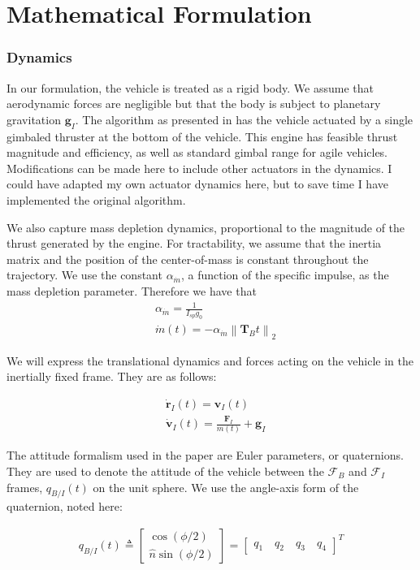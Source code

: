 \chapter{Mathematical Formulation}
\label{mathchapter}



\subsection{Dynamics}
In our formulation, the vehicle is treated as a rigid body. We assume that aerodynamic forces are negligible but that the body is subject to planetary gravitation $\mathbf{g}_I$. The algorithm as presented in \cite{6dofsucc} has the vehicle actuated by a single gimbaled thruster at the bottom of the vehicle. This engine has feasible thrust magnitude and efficiency, as well as standard gimbal range for agile vehicles. Modifications can be made here to include other actuators in the dynamics. I could have adapted my own actuator dynamics here, but to save time I have implemented the original algorithm.

We also capture mass depletion dynamics, proportional to the magnitude of the thrust generated by the engine. For tractability, we assume that the inertia matrix and the position of the center-of-mass is constant throughout the trajectory. We use the constant $\alpha_{\dot{m}}$, a function of the specific impulse, as the mass depletion parameter. Therefore we have that
\begin{align}
& \alpha_{\dot{m}} = \frac{1}{I_{sp} g_0} \\
& \dot{m}(t) = -\alpha_{\dot{m}} \left\lVert \mathbf{T}_B{t} \right\rVert _2
\end{align}

We will express the translational dynamics and forces acting on the vehicle in the inertially fixed frame. They are as follows:

\begin{align}
& \dot{\mathbf{r}}_I(t) = \mathbf{v}_I(t) \\
& \dot{\mathbf{v}}_I(t) = \frac{\mathbf{F}_I}{m(t)} + \mathbf{g}_I
\end{align}

The attitude formalism used in the paper are Euler parameters, or quaternions. They are used to denote the attitude of the vehicle between the $\mathcal{F}_B$ and $\mathcal{F}_I$ frames, $q_{B/I}(t)$ on the unit sphere. We use the angle-axis form of the quaternion, noted here:

\begin{align}
q_{B/I}(t) \triangleq 
	\begin{bmatrix}
	\cos(\phi/2) \\ \hat{n}\sin(\phi/2)
	\end{bmatrix}
	= 
	\begin{bmatrix}
	q_1 \quad q_2 \quad q_3 \quad q_4
	\end{bmatrix}^T
\end{align}

